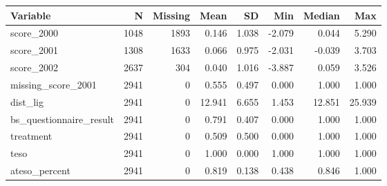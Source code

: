 \begin{table}
\centering
\begin{tabular}[t]{lrrrrrrr}
\toprule
Variable & N & Missing & Mean & SD & Min & Median & Max\\
\midrule
score\_2000 & 1048 & 1893 & 0.146 & 1.038 & -2.079 & 0.044 & 5.290\\
score\_2001 & 1308 & 1633 & 0.066 & 0.975 & -2.031 & -0.039 & 3.703\\
score\_2002 & 2637 & 304 & 0.040 & 1.016 & -3.887 & 0.059 & 3.526\\
missing\_score\_2001 & 2941 & 0 & 0.555 & 0.497 & 0.000 & 1.000 & 1.000\\
dist\_lig & 2941 & 0 & 12.941 & 6.655 & 1.453 & 12.851 & 25.939\\
\addlinespace
bs\_questionnaire\_result & 2941 & 0 & 0.791 & 0.407 & 0.000 & 1.000 & 1.000\\
treatment & 2941 & 0 & 0.509 & 0.500 & 0.000 & 1.000 & 1.000\\
teso & 2941 & 0 & 1.000 & 0.000 & 1.000 & 1.000 & 1.000\\
ateso\_percent & 2941 & 0 & 0.819 & 0.138 & 0.438 & 0.846 & 1.000\\
\bottomrule
\end{tabular}
\end{table}